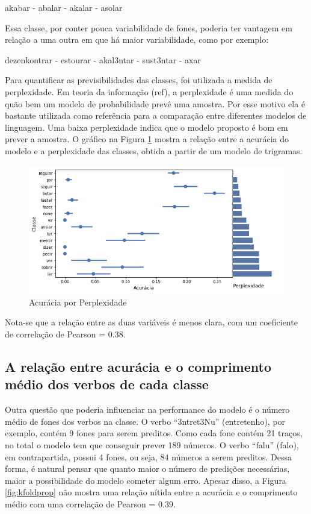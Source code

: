 \begin{center}
    akabar - abalar - akalar - asolar
\end{center}

Essa classe, por conter pouca variabilidade de fones, poderia ter vantagem em relação a uma outra em que há maior variabilidade, como por exemplo:

\begin{center}
    dezenkontrar - estourar - akal3ntar - sust3ntar - axar
\end{center}

Para quantificar as previsibilidades das classes, foi utilizada a medida de perplexidade. Em teoria da informação (ref), a perplexidade é uma medida do quão bem um modelo de probabilidade prevê uma amostra. Por esse motivo ela é bastante utilizada como referência para a comparação entre diferentes modelos de linguagem. Uma baixa perplexidade indica que o modelo proposto é bom em prever a amostra. O gráfico na Figura \ref{fig:kfoldperp} mostra a relação entre a acurácia do modelo e a perplexidade das classes, obtida a partir de um modelo de trigramas.  %


\begin{figure}[H]
  \centering
  \includegraphics[width=0.8\linewidth]{img/perplexidade.png}
  \caption{Acurácia por Perplexidade}
  \label{fig:kfoldperp}
\end{figure}

Nota-se que a relação entre as duas variáveis é menos clara, com um coeficiente de correlação de Pearson = 0.38. 

\subsection{A relação entre acurácia e o comprimento médio dos verbos de cada classe}

Outra questão que poderia influenciar na performance do modelo é o número médio de fones dos verbos na classe.  O verbo “3ntret3Nu” (entretenho), por exemplo, contém 9 fones para serem preditos. Como cada fone contém 21 traços, no total o modelo tem que conseguir prever 189 números. O verbo “falu” (falo), em contrapartida, possui 4 fones, ou seja, 84 números a serem preditos. Dessa forma, é natural pensar que quanto maior o número de predições necessárias, maior a possibilidade do modelo cometer algum erro. Apesar disso, a Figura \ref{fig:kfoldprop} não mostra uma relação nítida entre a acurácia e o comprimento médio com uma correlação de Pearson = 0.39.

